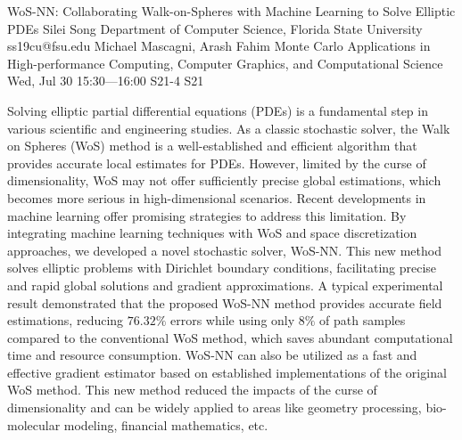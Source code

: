 \begin{talk}
  {WoS-NN: Collaborating Walk-on-Spheres with Machine Learning to Solve Elliptic PDEs}%
  {Silei Song}%
  {Department of Computer Science, Florida State University}%
  {ss19cu@fsu.edu}%
  {Michael Mascagni, Arash Fahim}%
  {Monte Carlo Applications in High-performance Computing, Computer Graphics, and Computational Science}%
  {Wed, Jul 30 15:30---16:00}%
  {S21-4}%
  {S21}%
    
   
Solving elliptic partial differential equations (PDEs) is a fundamental step in various scientific and engineering studies. As a classic stochastic solver, the Walk on Spheres (WoS) method is a well-established and efficient algorithm that provides accurate local estimates for PDEs. However, limited by the curse of dimensionality, WoS may not offer sufficiently precise global estimations, which becomes more serious in high-dimensional scenarios. Recent developments in machine learning offer promising strategies to address this limitation. By integrating machine learning techniques with WoS and space discretization approaches, we developed a novel stochastic solver, WoS-NN. This new method solves elliptic problems with Dirichlet boundary conditions, facilitating precise and rapid global solutions and gradient approximations. A typical experimental result demonstrated that the proposed WoS-NN method provides accurate field estimations, reducing $76.32\%$ errors while using only $8\%$ of path samples compared to the conventional WoS method, which saves abundant computational time and resource consumption. WoS-NN can also be utilized as a fast and effective gradient estimator based on established implementations of the original WoS method. This new method reduced the impacts of the curse of dimensionality and can be widely applied to areas like geometry processing, bio-molecular modeling, financial mathematics, etc.

\medskip

\end{talk}

